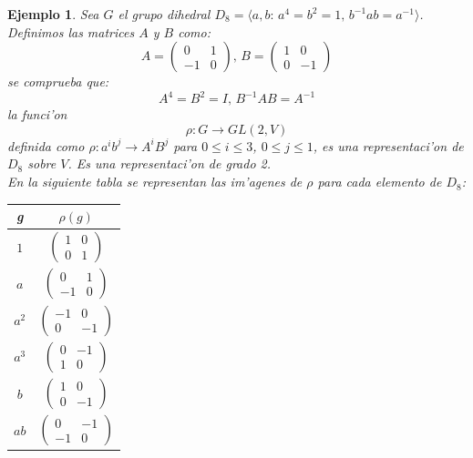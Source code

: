 \documentclass[a4paper,openright,12pt]{book}
\numberwithin{equation}{section} %
\newtheorem{ejemplo}{Ejemplo}[section] %
\begin{document}
\begin{ejemplo}
Sea $G$ el grupo dihedral $D_8=\langle a,b:\, a^{4}=b^{2}=1,\, b^{-1}ab=a^{-1} \rangle$. Definimos las matrices $A$ y $B$ como:
\[
A= \left( \begin{array}{cc}
0 & 1  \\
-1 & 0  \end{array} \right),\,
B= \left( \begin{array}{cc}
1 & 0  \\
0 & -1  \end{array} \right)
\] 
se comprueba que:
\[
A^{4}=B^{2}=I, \, B^{-1}AB=A^{-1}
\]
la funci'on
\[
\rho : G \rightarrow GL(2,V)
\]
definida como $\rho: a^{i}b^{j} \rightarrow A^{i}B^{j}$ para $0\leq i \leq 3$, $0\leq j \leq 1$, es una representaci'on de $D_{8}$ sobre $V$. Es una representaci'on de grado 2.\\
En la siguiente tabla se representan las im'agenes de $\rho$ para cada elemento de $D_{8}$:
\begin{table}[H]
\begin{center}
\begin{tabular}{|c|c|}
\hline
g & $\rho (g)$ \\
\hline \hline
$1$ & $\left( \begin{array}{cc}
1 & 0  \\
0 & 1  \end{array} \right)$ \\ \hline 
$a$ & $\left( \begin{array}{cc}
0 & 1  \\
-1 & 0  \end{array} \right)$ \\ \hline
$a^{2}$ & $\left( \begin{array}{cc}
-1 & 0  \\
0 & -1  \end{array} \right)$ \\ \hline
$a^{3}$ & $\left( \begin{array}{cc}
0 & -1  \\
1 & 0  \end{array} \right)$ \\ \hline
$b$ & $\left( \begin{array}{cc}
1 & 0  \\
0 & -1  \end{array} \right)$ \\ \hline
$ab$ & $\left( \begin{array}{cc}
0 & -1  \\
-1 & 0  \end{array} \right)$ \\ \hline

\end{tabular}
\end{center}
\end{table}
\end{ejemplo}
\end{document}
